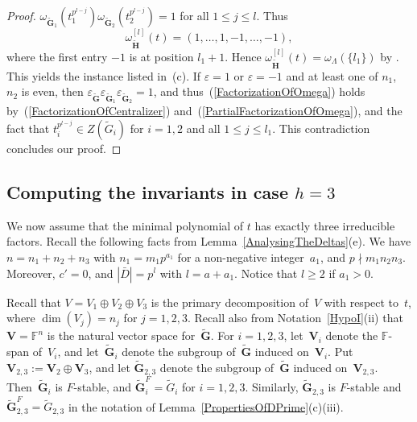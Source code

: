 \documentclass[12pt]{amsart}
\newcommand{\bG}{{\mathbf{G}}}      %
\newcommand{\bH}{{\mathbf{H}}}
\newcommand{\bV}{{\mathbf{V}}}
\theoremstyle{theorem}
\theoremstyle{definition}
\theoremstyle{remark}
\begin{document}
\begin{proof}
$\omega_{\tilde{\bG}_1}( t_1^{p^{l-j}} ) \omega_{\tilde{\bG}_2}( t_2^{p^{l-j}} ) = 1$
for all $1 \leq j \leq l$.
Thus 
$$\omega_{\tilde{\bH}}^{[l]}( t ) = (1, \ldots , 1, -1, \ldots , -1),$$
where the first entry $-1$ is at position $l_1 + 1$. Hence
$\omega_{\tilde{\bH}}^{[l]}( t ) = \omega_{\Lambda}( \{ l_1 \} )$
by \cite[Lemma~$2.2.1$]{HL25}. This yields the instance listed in~(c).
If $\varepsilon = 1$ or $\varepsilon = -1$ and at least one of $n_1$,~$n_2$ is even, then 
$\varepsilon_{\tilde{\bG}} \varepsilon_{\tilde{\bG}_1} \varepsilon_{\tilde{\bG}_2} = 1$,
and thus~(\ref{FactorizationOfOmega}) holds by~(\ref{FactorizationOfCentralizer})
and~(\ref{PartialFactorizationOfOmega}), and the fact that
$t_i^{p^{l-j}} \in Z( \tilde{G}_i )$ for $i = 1, 2$ and all $1 \leq j \leq l_1$.
This contradiction concludes our proof.
\end{proof}

\addtocounter{subsection}{1}
\subsection{Computing the invariants in case $h = 3$}
We now assume that the minimal polynomial of $t$ has exactly three irreducible
factors. Recall the following facts from Lemma~\ref{AnalysingTheDeltas}(e). We 
have $n = n_1 + n_2 + n_3$ with $n_1 = m_1p^{a_1}$ 
for a non-negative integer~$a_1$, and $p \nmid m_1n_2n_3$. Moreover, $c' = 0$, 
and $|\bar{D}| = p^l$ with $l = a + a_1$. Notice that $l \geq 2$ if $a_1 > 0$.

Recall that $V = V_1 \oplus V_2 \oplus V_3$ is the primary decomposition of~$V$ 
with respect to~$t$, where $\dim(V_j) = n_j$ for $j = 1, 2, 3$. Recall also from
Notation~\ref{HypoI}(ii) that $\bV = \mathbb{F}^n$ is the natural vector space 
for~$\tilde{\bG}$. For $i = 1, 2, 3$, let~$\bV_i$ denote the $\mathbb{F}$-span 
of~$V_i$, and let~$\tilde{\bG}_i$ denote the subgroup of~$\tilde{\bG}$ induced 
on~$\bV_i$. Put $\bV_{2,3} := \bV_2 \oplus \bV_3$, and let $\tilde{\bG}_{2,3}$ 
denote the subgroup of~$\tilde{\bG}$ induced on~$\bV_{2,3}$. 
Then~$\tilde{\bG}_i$ is $F$-stable, and $\tilde{\bG}_i^F = \tilde{G}_i$ for 
$i = 1, 2, 3$. Similarly, $\tilde{\bG}_{2,3}$ is $F$-stable and 
$\tilde{\bG}_{2,3}^F = \tilde{G}_{2,3}$ in the notation of 
Lemma~\ref{PropertiesOfDPrime}(c)(iii). 
\end{document}

